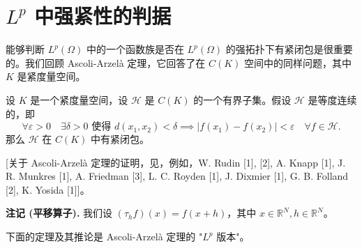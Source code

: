 \section{$L^p$ 中强紧性的判据}

能够判断 $L^p(\Omega)$ 中的一个函数族是否在 $L^p(\Omega)$ 的强拓扑下有紧闭包是很重要的。我们回顾 Ascoli-Arzelà 定理，它回答了在 $C(K)$ 空间中的同样问题，其中 $K$ 是紧度量空间。

\begin{theorem}\label{theorem4.25}
设 $K$ 是一个紧度量空间，设 $\mathcal{H}$ 是 $C(K)$ 的一个有界子集。假设 $\mathcal{H}$ 是等度连续的，即
\begin{equation}\label{eq:ascoli_arzelà}
\forall \varepsilon > 0 \quad \exists \delta > 0 \text{ 使得 } d(x_1, x_2) < \delta \implies |f(x_1) - f(x_2)| < \varepsilon \quad \forall f \in \mathcal{H}. \tag{21}
\end{equation}
那么 $\mathcal{H}$ 在 $C(K)$ 中有紧闭包。
\end{theorem}
[关于 Ascoli-Arzelà 定理的证明，见，例如，W. Rudin [1], [2], A. Knapp [1], J. R. Munkres [1], A. Friedman [3], L. C. Royden [1], J. Dixmier [1], G. B. Folland [2], K. Yosida [1]]。

\textbf{注记 (平移算子).} 我们设 $(\tau_h f)(x) = f(x+h)$，其中 $x \in \mathbb{R}^N, h \in \mathbb{R}^N$。

下面的定理及其推论是 Ascoli-Arzelà 定理的 "$L^p$ 版本"。

